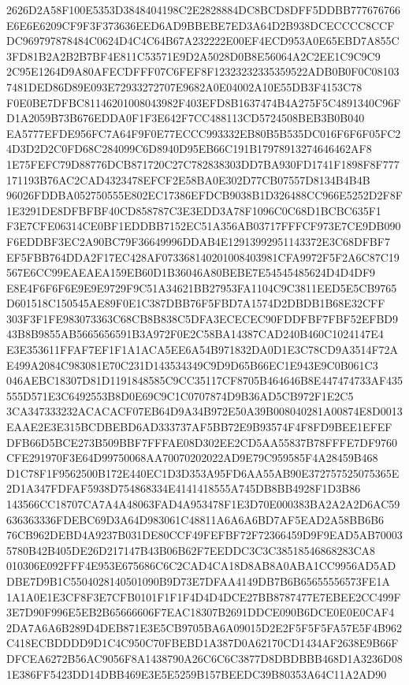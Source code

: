 \documentclass[UTF8,fontset=fandol,zihao=-4,a4paper]{ctexart}
\begin{document}
{{2626D2A58F100E5353D3848404198C2E2828884DC8BCD8DFF5DDBB777676766E6E6E6209CF9F3F373636EED6AD9BBEBE7ED3A64D2B938DCECCCC8CCF
DC969797878484C0624D4C4C64B67A232222E00EF4ECD953A0E65EBD7A855C3FD81B2A2B2B7BF4E811C53571E9D2A5028D0B8E56064A2C2EE1C9C9C9
2C95E1264D9A80AFECDFFF07C6FEF8F12323232335359522ADB0B0F0C081037481DED86D89E093E72933272707E9682A0E04002A10E55DB3F4153C78
F0E0BE7DFBC81146201008043982F403EFD8B1637474B4A275F5C4891340C96FD1A2059B73B676EDDA0F1F3E642F7CC488113CD5724508BEB3B0B040
EA5777EFDE956FC7A64F9F0E77ECCC993332EB80B5B535DC016F6F6F05FC24D3D2D2C0FD68C284099C6D8940D95EB66C191B17978913274646462AF8
1E75FEFC79D88776DCB871720C27C782838303DD7BA930FD1741F1898F8F777171193B76AC2CAD4323478EFCF2E58BA0E302D77CB07557D8134B4B4B
96026FDDBA052750555E802EC17386EFDCB9038B1D326488CC966E5252D2F8F1E3291DE8DFBFBF40CD858787C3E3EDD3A78F1096C0C68D1BCBC635F1
F3E7CFE06314CE0BF1EDDBB7152EC51A356AB03717FFFCF973E7CE9DB090F6EDDBF3EC2A90BC79F36649996DDAB4E12913992951143372E3C68DFBF7
EF5FBB764DDA2F17EC428AF073368140201008403981CFA9972F5F2A6C87C19567E6CC99EAEAEA159EB60D1B36046A80BEBE7E54545485624D4D4DF9
E8E4F6F6F6E9E9E9729F9C51A34621BB27953FA1104C9C3811EED5E5CB9765D601518C150545AE89F0E1C387DBB76F5FBD7A1574D2DBDB1B68E32CFF
303F3F1FE983073363C68CB8B838C5DFA3ECECEC90FDDFBF7FBF52EFBD943B8B9855AB5665656591B3A972F0E2C58BA14387CAD240B460C1024147E4
E3E353611FFAF7EF1F1A1ACA5EE6A54B971832DA0D1E3C78CD9A3514F72AE499A2084C983081E70C231D143534349C9D9D65B66EC1E943E9C0B061C3
046AEBC18307D81D1191848585C9CC35117CF8705B464646B8E447474733AF435555D571E3C6492553B8D0E69C9C1C0707874D9B36AD5CB972F1E2C5
3CA347333232ACACACF07EB64D9A34B972E50A39B008040281A00874E8D0013EAAE2E3E315BCDBEBD6AD333737AF5BB72E9B93574F4F8FD9BEE1EFEF
DFB66D5BCE273B509BBF7FFFAE08D302EE2CD5AA55837B78FFFE7DF9760CFE291970F3E64D99750068AA70070202022AD9E79C959585F4A28459B468
D1C78F1F9562500B172E440EC1D3D353A95FD6AA55AB90E372757525075365E2D1A347FDFAF5938D754868334E4141418555A745DB8BB4928F1D3B86
143566CC18707CA7A4A48063FAD4A953478F1E3D70E000383BA2A2A2D6AC59636363336FDEBC69D3A64D983061C48811A6A6A6BD7AF5EAD2A58BB6B6
76CB962DEBD4A9237B031DE80CCF49FEFBF72F72366459D9F9EAD5AB700035780B42B405DE26D217147B43B06B62F7EEDDC3C3C38518546868283CA8
010306E092FFF4E953E675686C6C2CAD4CA18D8AB8A0ABA1CC9956AD5ADDBE7D9B1C5504028140501090B9D73E7DFAA4149DB7B6B65655556573FE1A
1A1A0E1E3CF8F3E7CFB0101F1F1F4D4D4DCE27BB8787477E7EBEE2CC499F3E7D90F996E5EB2B65666606F7EAC18307B2691DDCE090B6DCE0E0E0CAF4
2DA7A6A6B289D4DEB871E3E5CB9705BA6A09015D2E2F5F5F5FA57E5F4B962C418ECBDDDD9D1C4C950C70FBEBD1A387D0A62170CD1434AF2638E9B66F
DFCEA6272B56AC9056F8A1438790A26C6C6C3877D8DBDBBB468D1A3236D081E386FF5423DD14DBB469E3E5E5259B157BEEDC39B80353A64C11A2AD90
}}
\end{document}
